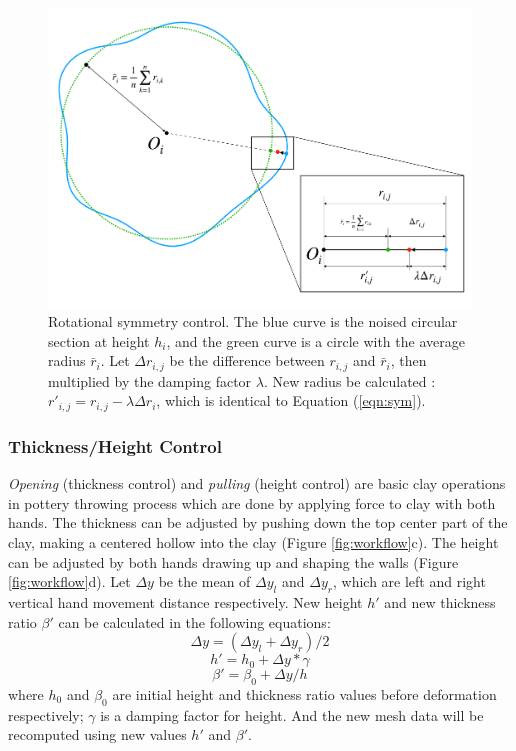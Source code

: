 \documentclass{svjour3}                     %
\begin{document}
\begin{figure}
\includegraphics[width=\textwidth]{fig7.pdf}
\caption{Rotational symmetry control. The blue curve is the noised circular section at height $h_{i}$, and the green curve is a circle with the average radius $\bar r_{i}$. Let $\Delta r_{i,j}$ be the difference between $r_{i,j}$ and $\bar r_{i}$, then multiplied by the damping factor $\lambda$. New radius be calculated : $r'_{i, j} = r_{i,j} - \lambda\Delta r_{i}$, which is identical to Equation (\ref{eqn:sym}). }
\label{fig:symmetry}
\end{figure}

\subsubsection{Thickness/Height Control}
\label{sec:4.2.2}
\textit{Opening} (thickness control) and \textit{pulling} (height control) are basic clay operations in pottery throwing process which are done by applying force to clay with both hands. The thickness can be adjusted by pushing down the top center part of the clay, making a centered hollow into the clay (Figure \ref{fig:workflow}c). The height can be adjusted by both hands drawing up and shaping the walls (Figure \ref{fig:workflow}d).
Let $\Delta y$ be the mean of $\Delta y_{l}$ and $\Delta y_{r}$, which are left and right vertical hand movement distance respectively. New height $h'$ and new thickness ratio $\beta'$ can be calculated in the following equations:
\begin{equation}
\Delta y = (\Delta y_{l} + \Delta y_{r})/2
\end{equation}
\begin{equation}
h' = h_{0} + \Delta y * \gamma
\end{equation}
\begin{equation}
\beta' = \beta_{0} + \Delta y/ h
\end{equation}
where $h_{0}$ and $\beta_{0}$ are initial height and thickness ratio values before deformation respectively; $\gamma$ is a damping factor for height. And the new mesh data will be recomputed using new values $h'$ and $\beta'$.
\end{document}
